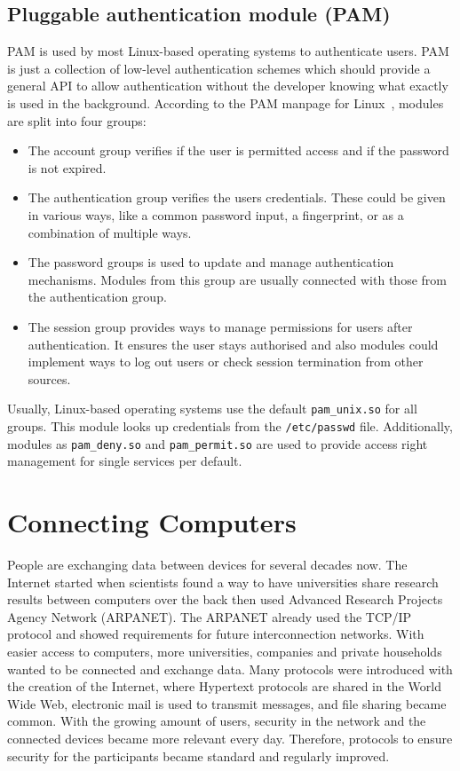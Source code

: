 \subsection{Pluggable authentication module (PAM)}

PAM is used by most Linux-based operating systems to authenticate users. PAM is
just a collection of low-level authentication schemes which should provide a
general API to allow authentication without the developer knowing what exactly
is used in the background. According to the PAM manpage for Linux~\cite{pamman},
modules are split into four groups:

\begin{itemize}
\item The account group verifies if the user is permitted access and if the
password is not expired.
\item The authentication group verifies the user\textquotesingle s credentials.
These could be given in various ways, like a common password input, a
fingerprint, or as a combination of multiple ways.
\item The password groups is used to update and manage authentication
mechanisms. Modules from this group are usually connected with those from the
authentication group.
\item The session group provides ways to manage permissions for users after
authentication. It ensures the user stays authorised and also modules could
implement ways to log out users or check session termination from other sources.
\end{itemize}

Usually, Linux-based operating systems use the default \texttt{pam\_unix.so} for
all groups. This module looks up credentials from the \texttt{/etc/passwd} file.
Additionally, modules as \texttt{pam\_deny.so} and \texttt{pam\_permit.so} are
used to provide access right management for single services per default.

\section{Connecting Computers}

People are exchanging data between devices for several decades now. The Internet
started when scientists found a way to have universities share research results
between computers over the back then used Advanced Research Projects Agency
Network (ARPANET).  The ARPANET already used the TCP/IP protocol and showed
requirements for future interconnection networks. With easier access to
computers, more universities, companies and private households wanted to be
connected and exchange data. Many protocols were introduced with the creation of
the Internet, where Hypertext protocols are shared in the World Wide Web,
electronic mail is used to transmit messages, and file sharing became common.
With the growing amount of users, security in the network and the connected
devices became more relevant every day. Therefore, protocols to ensure security
for the participants became standard and regularly improved.

